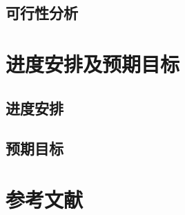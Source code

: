		\subsection{可行性分析} %
		\label{sub:可行性分析}
		
	\newpage
	\section{进度安排及预期目标} %
	\label{sec:进度安排及预期目标}
		\subsection{进度安排} %
		\label{sub:进度安排}
		
		\subsection{预期目标} %
		\label{sub:预期目标}
		
	\newpage
	\section*{参考文献} %
	\label{sec:参考文献2}
	

